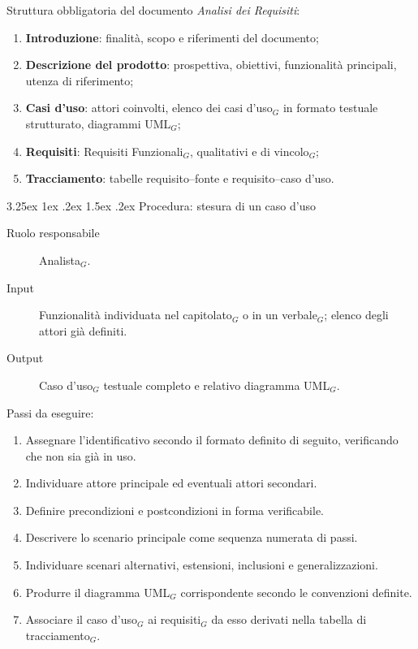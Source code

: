 \documentclass[a4paper, 10pt]{article}
\makeatletter
\renewcommand\paragraph{\@startsection{paragraph}{4}{\z@}%
  {3.25ex \@plus1ex \@minus .2ex}%
  {1.5ex \@plus .2ex}%
  {\normalfont\normalsize\bfseries}}
\makeatother
\begin{document}
\noindent Struttura obbligatoria del documento \textit{Analisi dei Requisiti}:
\begin{enumerate}
    \item \textbf{Introduzione}: finalità, scopo e riferimenti del documento;
    \item \textbf{Descrizione del prodotto}: prospettiva, obiettivi, funzionalità principali, utenza di riferimento;
    \item \textbf{Casi d'uso}: attori coinvolti, elenco dei casi d'uso$_G$ in formato testuale strutturato, diagrammi UML$_G$;
    \item \textbf{Requisiti}: Requisiti Funzionali$_G$, qualitativi e di vincolo$_G$;
    \item \textbf{Tracciamento}: tabelle requisito--fonte e requisito--caso d'uso.
\end{enumerate}
\paragraph{Procedura: stesura di un caso d'uso}\label{attivita-casi-uso}

\begin{description}
    \item[Ruolo responsabile] Analista$_G$.
    \item[Input] Funzionalità individuata nel capitolato$_G$ o in un verbale$_G$; elenco degli attori già definiti.
    \item[Output] Caso d'uso$_G$ testuale completo e relativo diagramma UML$_G$.
\end{description}

\noindent Passi da eseguire:
\begin{enumerate}
    \item Assegnare l'identificativo secondo il formato definito di seguito, verificando che non sia già in uso.
    \item Individuare attore principale ed eventuali attori secondari.
    \item Definire precondizioni e postcondizioni in forma verificabile.
    \item Descrivere lo scenario principale come sequenza numerata di passi.
    \item Individuare scenari alternativi, estensioni, inclusioni e generalizzazioni.
    \item Produrre il diagramma UML$_G$ corrispondente secondo le convenzioni definite.
    \item Associare il caso d'uso$_G$ ai requisiti$_G$ da esso derivati nella tabella di tracciamento$_G$.
\end{enumerate}
\end{document}
